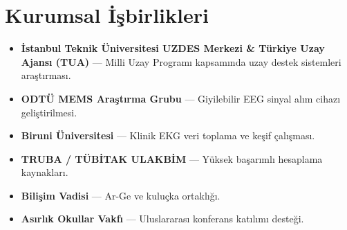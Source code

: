 \documentclass[11pt,a4paper]{article}
\begin{document}
\section*{Kurumsal İşbirlikleri}
\begin{itemize}
    \item \textbf{İstanbul Teknik Üniversitesi UZDES Merkezi \& Türkiye Uzay Ajansı (TUA)} --- Milli Uzay Programı kapsamında uzay destek sistemleri araştırması.
    \item \textbf{ODTÜ MEMS Araştırma Grubu} --- Giyilebilir EEG sinyal alım cihazı geliştirilmesi.
    \item \textbf{Biruni Üniversitesi} --- Klinik EKG veri toplama ve keşif çalışması.
    \item \textbf{TRUBA / TÜBİTAK ULAKBİM} --- Yüksek başarımlı hesaplama kaynakları.
    \item \textbf{Bilişim Vadisi} --- Ar-Ge ve kuluçka ortaklığı.
    \item \textbf{Asırlık Okullar Vakfı} --- Uluslararası konferans katılımı desteği.
\end{itemize}

\end{document}
